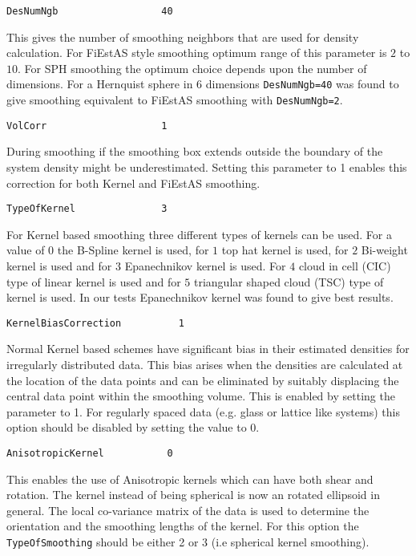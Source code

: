 \documentclass{article}
\begin{document}
\begin{verbatim}
DesNumNgb                  40
\end{verbatim}
This gives the number of smoothing neighbors 
that are used for density calculation.
For FiEstAS style smoothing optimum range of this
parameter is $2$ to $10$. For SPH smoothing the optimum 
choice depends upon the number of dimensions. 
For a Hernquist sphere in 6 dimensions 
\verb$DesNumNgb=40$ was found to give smoothing 
equivalent to FiEstAS smoothing with \verb$DesNumNgb=2$. 


\begin{verbatim}
VolCorr                    1
\end{verbatim}
During smoothing if the smoothing
box extends outside the boundary of the system
density might be underestimated.  Setting this parameter 
to 1 enables this correction for both Kernel  and FiEstAS 
smoothing. 



\begin{verbatim}
TypeOfKernel               3
\end{verbatim}
For Kernel based smoothing 
three different types of kernels
can be used. For a value of $0$ 
the B-Spline kernel is used,
for $1$ top hat kernel is used, for $2$ Bi-weight kernel 
is used and for $3$ Epanechnikov kernel is used. 
For $4$ cloud in cell (CIC) type of linear kernel is 
used and for $5$ triangular shaped cloud (TSC) type 
of kernel is used.
In our tests Epanechnikov kernel was found to give 
best results. 


\begin{verbatim}
KernelBiasCorrection          1
\end{verbatim}
Normal Kernel based schemes have significant bias in
their estimated densities for irregularly
distributed data. This bias arises when the densities are calculated
at the location of the data points and can be eliminated by suitably  
displacing the central data point within the smoothing volume.
This is enabled by setting the parameter to 1. For regularly spaced 
data (e.g.  glass or lattice like systems)  this option  should be 
disabled by setting the value  to 0.


\begin{verbatim}
AnisotropicKernel           0
\end{verbatim}
This enables the use of Anisotropic kernels which 
can have both shear and rotation.
The kernel instead of being spherical is 
now an rotated ellipsoid in general.
The local co-variance matrix of the data is used to 
determine the orientation and the smoothing
lengths of the kernel. For this option the \verb$TypeOfSmoothing$
should be either 2 or 3 (i.e spherical kernel smoothing). 
\end{document}
